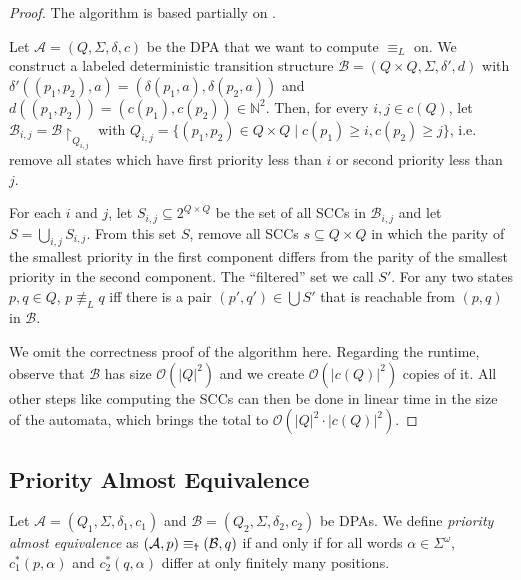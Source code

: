 \begin{proof}
	The algorithm is based partially on \cite{HenzingerTelle1996}.
	
	Let $\mathcal{A} = (Q, \Sigma, \delta, c)$ be the DPA that we want to compute $\equiv_L$ on. We construct a labeled deterministic transition structure $\mathcal{B} = (Q \times Q, \Sigma, \delta', d)$ with $\delta'((p_1, p_2), a) = (\delta(p_1, a), \delta(p_2, a))$ and $d((p_1, p_2)) = (c(p_1), c(p_2)) \in \mathbb{N}^2$. Then, for every $i, j \in c(Q)$, let $\mathcal{B}_{i,j} = \mathcal{B} \upharpoonright_{Q_{i,j}}$ with $Q_{i,j} = \{ (p_1, p_2) \in Q \times Q \mid c(p_1) \geq i, c(p_2) \geq j \}$, i.e. remove all states which have first priority less than $i$ or second priority less than $j$.
	
	For each $i$ and $j$, let $S_{i,j} \subseteq 2^{Q \times Q}$ be the set of all SCCs in $\mathcal{B}_{i,j}$ and let $S = \bigcup_{i,j} S_{i,j}$. From this set $S$, remove all SCCs $s \subseteq Q \times Q$ in which the parity of the smallest priority in the first component differs from the parity of the smallest priority in the second component. The \enquote{filtered} set we call $S'$. For any two states $p, q \in Q$, $p \not\equiv_L q$ iff there is a pair $(p', q') \in \bigcup S'$ that is reachable from $(p, q)$ in $\mathcal{B}$.
	
	We omit the correctness proof of the algorithm here. Regarding the runtime, observe that $\mathcal{B}$ has size $\mathcal{O}(|Q|^2)$ and we create $\mathcal{O}(|c(Q)|^2)$ copies of it. All other steps like computing the SCCs can then be done in linear time in the size of the automata, which brings the total to $\mathcal{O}(|Q|^2 \cdot |c(Q)|^2)$.
\end{proof}

\vspace{5pt}

\subsection{Priority Almost Equivalence}

\begin{defn}
	Let $\mathcal{A} = (Q_1, \Sigma, \delta_1, c_1)$ and $\mathcal{B} = (Q_2, \Sigma, \delta_2, c_2)$ be DPAs. We define \emph{priority almost equivalence} as $(\mathcal{A}, p) \equiv_\text{\Ankh} (\mathcal{B}, q)$ if and only if for all words $\alpha \in \Sigma^\omega$, $c_1^*(p, \alpha)$ and $c_2^*(q, \alpha)$ differ at only finitely many positions.
\end{defn}

